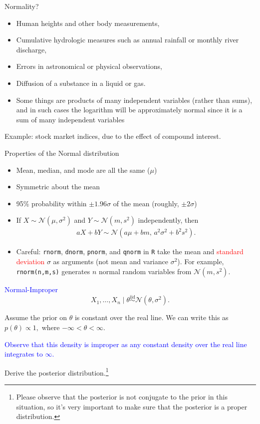 \documentclass[
  ignorenonframetext,
]{beamer}
\newcommand{\N}{\mathcal{N}}
\newcommand{\iid}{\stackrel{\mathrm{iid}}{\sim}}
\begin{document}
\begin{frame}{Normality?}
\protect\hypertarget{normality-1}{}
\begin{itemize}
\item
  Human heights and other body measurements,
\item
  Cumulative hydrologic measures such as annual rainfall or monthly
  river discharge,
\item
  Errors in astronomical or physical observations,
\item
  Diffusion of a substance in a liquid or gas.
\item
  Some things are products of many independent variables (rather than
  sums), and in such cases the logarithm will be approximately normal
  since it is a sum of many independent variables
\end{itemize}

Example: stock market indices, due to the effect of compound interest.
\end{frame}

\begin{frame}{Properties of the Normal distribution}
\protect\hypertarget{properties-of-the-normal-distribution}{}
\begin{itemize}
\item Mean, median, and mode are all the same ($\mu$)
\item Symmetric about the mean
\item 95\% probability within $\pm 1.96\sigma$ of the mean (roughly, $\pm 2\sigma$)
\item If $X\sim\N(\mu,\sigma^2)$ and $Y\sim\N(m,s^2)$ independently, then
\begin{align}\label{equation:linear-combination}
a X + b Y\sim\N(a\mu + b m,\,a^2\sigma^2+ b^2 s^2).
\end{align}
\item Careful: \texttt{rnorm}, \texttt{dnorm}, \texttt{pnorm}, and \texttt{qnorm} in \texttt{R} take the mean and \textcolor{red}{standard deviation} $\sigma$ as arguments (not mean and variance $\sigma^2$). For example, \texttt{rnorm(n,m,s)} generates $n$ normal random variables from $\N(m,s^2)$.
\end{itemize}
\end{frame}

\begin{frame}{\textcolor{blue}{Normal-Improper}}
\protect\hypertarget{section}{}
\[ X_1,\dotsc,X_n \mid \theta \iid\N(\theta,\sigma^2). \]

Assume the prior on \(\theta\) is constant over the real line. We can
write this as \(p(\theta) \propto 1,\) where
\(-\infty < \theta < \infty.\)

\textcolor{blue}{Observe that this density is improper as any constant density over the real line integrates to $\infty.$}

Derive the posterior
distribution.\footnote{Please observe that the posterior is not conjugate to the prior in this situation, so it's very important to make sure that the posterior is a proper distribution.}
\end{frame}
\end{document}
